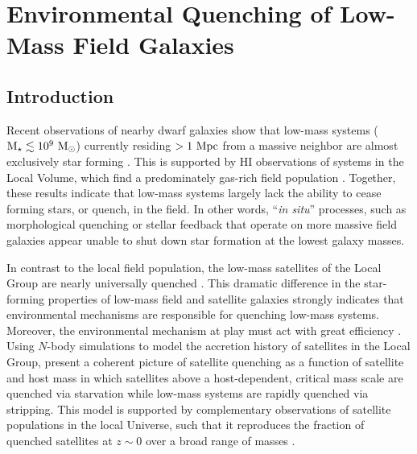 \chapter{Environmental Quenching of Low-Mass Field Galaxies}


\section{Introduction}
\label{sec:intro} 

Recent observations of nearby dwarf galaxies show that low-mass
systems (${\rm M}_{\star} \lesssim 10^{9}~{\rm M}_{\odot}$) currently residing $>1~{\rm
  Mpc}$ from a massive neighbor are almost exclusively star forming
\citep{mateo98, haines08, weisz11a, geha12}.
%
This is supported by H{\scriptsize I} observations of systems in the Local
Volume, which find a predominately gas-rich field population \citep{spekkens14}.
%
Together, these results indicate that low-mass systems largely lack
the ability to cease forming stars, or quench, in the field. 
%
In other words, ``{\it in situ}'' processes, such as morphological
quenching \citep{martig09} or stellar feedback \citep{larson74, ds86}
that operate on more massive field galaxies appear unable to shut down
star formation at the lowest galaxy masses. 
%




In contrast to the local field population, the low-mass satellites of
the Local Group are nearly universally quenched
\citep[e.g.][]{mateo98, grcevich09, spekkens14}. 
%
This dramatic difference in the star-forming properties of low-mass
field and satellite galaxies strongly indicates that environmental
mechanisms are responsible for quenching low-mass systems. 
Moreover, the environmental mechanism at play must act with great
efficiency \citep[i.e.~rapidly following infall,][]{fham15, wetzel15b}.
%
Using $N$-body simulations to model the accretion history of satellites in the
Local Group, \citet{fham16} present a coherent picture of
satellite quenching as a function of satellite and host mass in which
satellites above a host-dependent, critical mass scale are quenched
via starvation while low-mass systems are rapidly quenched via stripping.
%
This model is supported by complementary observations of satellite populations
in the local Universe, such that it reproduces the fraction of quenched
satellites at $z \sim 0$ over a broad range of masses \citep[e.g.][]{delucia12,
  wetzel13, davies16, stark16}.





